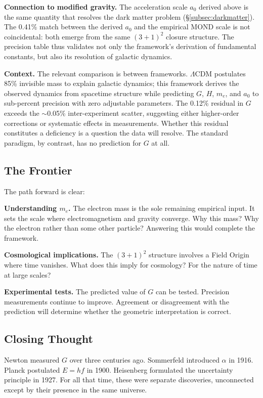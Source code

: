 \documentclass[aps,prd,preprint,superscriptaddress,showpacs,preprintnumbers,amsmath,amssymb,nofootinbib]{revtex4-2}
\begin{document}
\textbf{Connection to modified gravity.} The acceleration scale $a_0$ derived above is the same quantity that resolves the dark matter problem (\S\ref{subsec:darkmatter}). The 0.41\% match between the derived $a_0$ and the empirical MOND scale is not coincidental: both emerge from the same $(3+1)^2$ closure structure. The precision table thus validates not only the framework's derivation of fundamental constants, but also its resolution of galactic dynamics.

\textbf{Context.} The relevant comparison is between frameworks. $\Lambda$CDM postulates 85\% invisible mass to explain galactic dynamics; this framework derives the observed dynamics from spacetime structure while predicting $G$, $H$, $m_e$, and $a_0$ to sub-percent precision with zero adjustable parameters. The 0.12\% residual in $G$ exceeds the $\sim$0.05\% inter-experiment scatter, suggesting either higher-order corrections or systematic effects in measurements. Whether this residual constitutes a deficiency is a question the data will resolve. The standard paradigm, by contrast, has no prediction for $G$ at all.

\subsection{The Frontier}
\label{subsec:frontier}

The path forward is clear:

\textbf{Understanding $m_e$.} The electron mass is the sole remaining empirical input. It sets the scale where electromagnetism and gravity converge. Why this mass? Why the electron rather than some other particle? Answering this would complete the framework.

\textbf{Cosmological implications.} The $(3+1)^2$ structure involves a Field Origin where time vanishes. What does this imply for cosmology? For the nature of time at large scales?

\textbf{Experimental tests.} The predicted value of $G$ can be tested. Precision measurements continue to improve. Agreement or disagreement with the prediction will determine whether the geometric interpretation is correct.

\subsection{Closing Thought}
\label{subsec:closing}

Newton measured $G$ over three centuries ago. Sommerfeld introduced $\alpha$ in 1916. Planck postulated $E = hf$ in 1900. Heisenberg formulated the uncertainty principle in 1927. For all that time, these were separate discoveries, unconnected except by their presence in the same universe.
\end{document}
